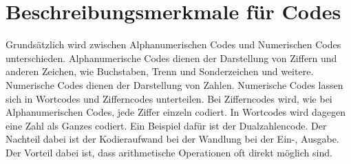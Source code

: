 \documentclass[11pt,a4paper]{scrreprt}
\begin{document}
\section{Beschreibungsmerkmale für Codes}
Grundsätzlich wird zwischen Alphanumerischen Codes und Numerischen Codes unterschieden. Alphanumerische Codes dienen der Darstellung von Ziffern und anderen Zeichen, wie Buchstaben, Trenn und Sonderzeichen und weitere. Numerische Codes dienen der Darstellung von Zahlen. Numerische Codes lassen sich in Wortcodes und Zifferncodes unterteilen. Bei Zifferncodes wird, wie bei Alphanumerischen Codes, jede Ziffer einzeln codiert. In Wortcodes wird dagegen eine Zahl als Ganzes codiert. Ein Beispiel dafür ist der Dualzahlencode. Der Nachteil dabei ist der Kodieraufwand bei der Wandlung bei der Ein-, Ausgabe. Der Vorteil dabei ist, dass arithmetische Operationen oft direkt möglich sind.
\end{document}
